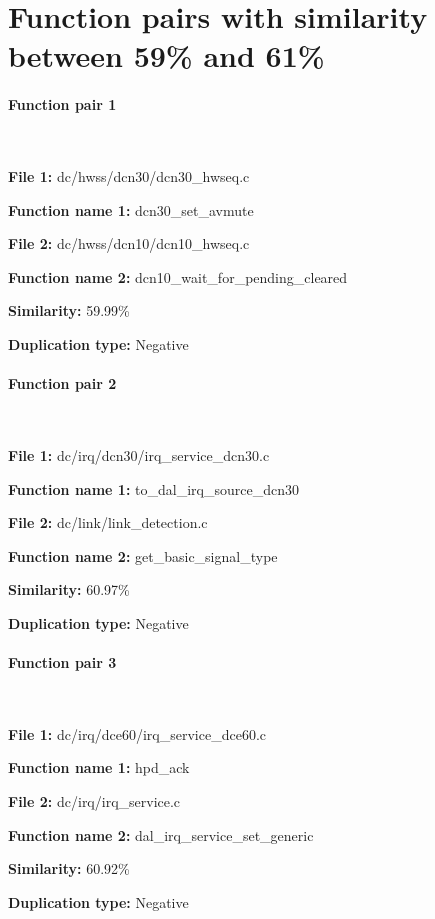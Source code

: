 \section{Function pairs with similarity between 59\% and 61\%}

\paragraph{Function pair 1 }  

\

\textbf{File 1:} dc/hwss/dcn30/dcn30\_hwseq.c

\textbf{Function name 1:} dcn30\_set\_avmute

\textbf{File 2:} dc/hwss/dcn10/dcn10\_hwseq.c

\textbf{Function name 2:} dcn10\_wait\_for\_pending\_cleared

\textbf{Similarity:} 59.99\%

\textbf{Duplication type:} Negative


\paragraph{Function pair 2 }  

\

\textbf{File 1:} dc/irq/dcn30/irq\_service\_dcn30.c

\textbf{Function name 1:} to\_dal\_irq\_source\_dcn30

\textbf{File 2:} dc/link/link\_detection.c

\textbf{Function name 2:} get\_basic\_signal\_type

\textbf{Similarity:} 60.97\%

\textbf{Duplication type:} Negative


\paragraph{Function pair 3 }  

\

\textbf{File 1:} dc/irq/dce60/irq\_service\_dce60.c

\textbf{Function name 1:} hpd\_ack

\textbf{File 2:} dc/irq/irq\_service.c

\textbf{Function name 2:} dal\_irq\_service\_set\_generic

\textbf{Similarity:} 60.92\%

\textbf{Duplication type:} Negative


